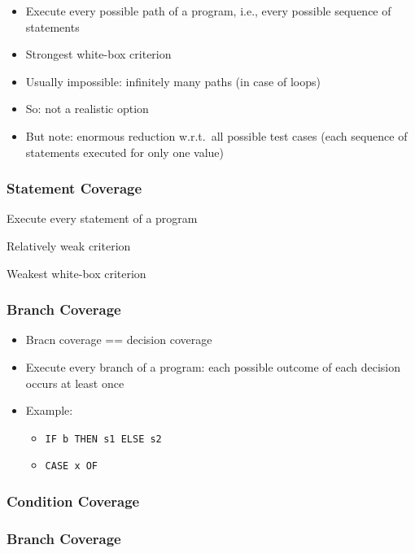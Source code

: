 \begin{itemize}
	\item Execute every possible path of a program, i.e., every possible sequence of statements
	\item Strongest white-box criterion
	\item Usually impossible: infinitely many paths (in case of loops)
	\item So: not a realistic option
	\item But note: enormous reduction w.r.t.\ all possible test cases (each sequence of statements executed for only one value)
\end{itemize}

\subsubsection{Statement Coverage}

\begin{itemize*}
	\item Execute every statement of a program
	\item Relatively weak criterion
	\item Weakest white-box criterion
\end{itemize*}

\subsubsection{Branch Coverage}

\begin{itemize}
	\item Bracn coverage == decision coverage
	\item Execute every branch of a program: each possible outcome of each decision occurs at least once
	\item Example:
	\begin{itemize}
		\item \verb|IF b THEN s1 ELSE s2|
		\item \verb|CASE x OF|
	\end{itemize}
\end{itemize}

\subsubsection{Condition Coverage}

\subsubsection{Branch Coverage}
